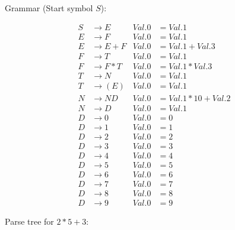 Grammar (Start symbol $S$):

\begin{equation*}
\begin{aligned}
S & \rightarrow E & Val.0 &=  Val.1 \\
E & \rightarrow F & Val.0 &=  Val.1 \\
E & \rightarrow E + F & Val.0 &=  Val.1 + Val.3 \\
F & \rightarrow T & Val.0 &=  Val.1 \\
F & \rightarrow F * T & Val.0 &=  Val.1 * Val.3 \\
T & \rightarrow N & Val.0 &=  Val.1 \\
T & \rightarrow (E) & Val.0 &=  Val.1 \\
N & \rightarrow N D & Val.0 &=  Val.1 * 10 + Val.2 \\
N & \rightarrow D & Val.0 &=  Val.1 \\
D & \rightarrow 0 & Val.0 &=  0 \\
D & \rightarrow 1 & Val.0 &=  1 \\
D & \rightarrow 2 & Val.0 &=  2 \\
D & \rightarrow 3 & Val.0 &=  3 \\
D & \rightarrow 4 & Val.0 &=  4 \\
D & \rightarrow 5 & Val.0 &=  5 \\
D & \rightarrow 6 & Val.0 &=  6 \\
D & \rightarrow 7 & Val.0 &=  7 \\
D & \rightarrow 8 & Val.0 &=  8 \\
D & \rightarrow 9 & Val.0 &=  9 
\end{aligned}
\end{equation*}

Parse tree for $2 * 5 + 3$:

